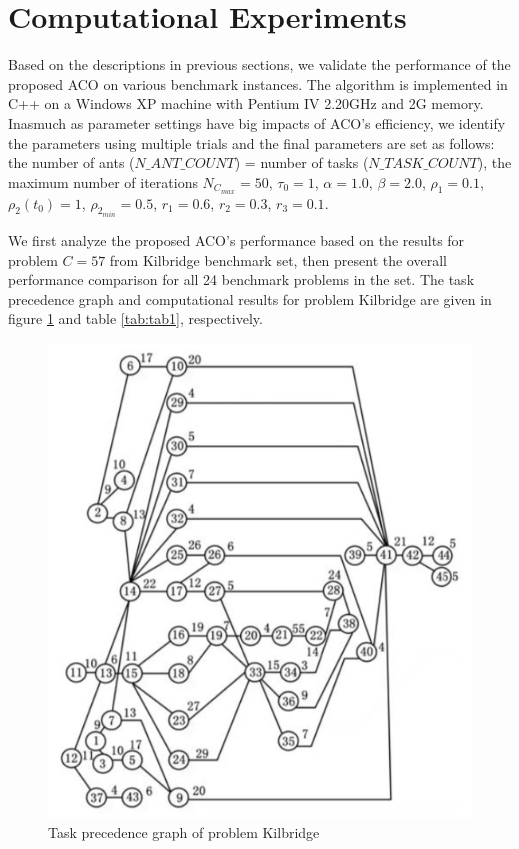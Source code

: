 \section{Computational Experiments}

Based on the descriptions in previous sections, we validate the performance of the proposed ACO on various benchmark instances.
The algorithm is implemented in C++ on a Windows XP machine with Pentium IV 2.20GHz and 2G memory. 
Inasmuch as parameter settings have big impacts of ACO's efficiency, we identify the parameters using multiple trials and the final parameters are set as follows: the number of ants ($N\_ANT\_COUNT$) = number of tasks ($N\_TASK\_COUNT$), the maximum number of iterations $N_{C_{max}} = 50$, $\tau_0 = 1$, $\alpha = 1.0$, $\beta = 2.0$, $\rho_1 = 0.1$, $\rho_2(t_0) = 1$, $\rho_{2_{min}} = 0.5$, $r_1 = 0.6$, $r_2 = 0.3$, $r_3 = 0.1$.

We first analyze the proposed ACO's performance based on the results for problem $C = 57$ from Kilbridge benchmark set, then present the overall performance comparison for all 24 benchmark problems in the set.
The task precedence graph and computational results for problem Kilbridge are given in figure \ref{fig:fig1} and table \ref{tab:tab1}, respectively.

\begin{figure}[h!]
	\begin{center}
		\includegraphics[width=0.6\linewidth]{sections/figure1.jpg}
		\caption{Task precedence graph of problem Kilbridge}
		\label{fig:fig1}
	\end{center}
\end{figure}


